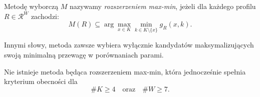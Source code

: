 \documentclass[12pt,a4paper]{mwrep}
\begin{document}
	\begin{definition}
		\label{def:maxmin-extension}
		Metodę wyborczą \(M\) nazywamy \textit{rozszerzeniem max-min}, jeżeli dla każdego profilu \(R \in \mathcal{R}^W\) zachodzi:
		\[
		M(R) \subseteq \arg\max_{x \in K} \min_{k \in K \setminus \{x\}} g_R(x,k).
		\]
		
		Innymi słowy, metoda zawsze wybiera wyłącznie kandydatów maksymalizujących swoją minimalną przewagę w porównaniach parami.
	\end{definition}

	\begin{theorem}
		Nie istnieje metoda będąca rozszerzeniem max-min, która jednocześnie spełnia kryterium obecności dla
		\[
		\#K \geq 4
		\quad \text{oraz} \quad
		\#W \geq 7.
		\]
	\end{theorem}
	
\end{document}
